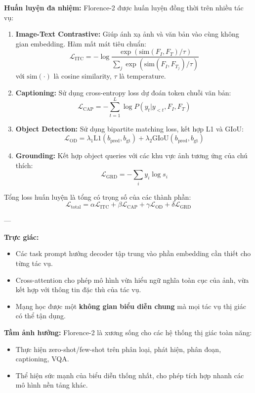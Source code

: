 \textbf{Huấn luyện đa nhiệm:}  
Florence-2 được huấn luyện đồng thời trên nhiều tác vụ:
\begin{enumerate}
	\item \textbf{Image-Text Contrastive:}  
	Giúp ánh xạ ảnh và văn bản vào cùng không gian embedding. Hàm mất mát tiêu chuẩn:
	\[
	\mathcal{L}_\text{ITC} = - \log \frac{\exp(\text{sim}(F_I, F_T)/\tau)}{\sum_j \exp(\text{sim}(F_I, F_{T_j})/\tau)}
	\]
	với $\text{sim}(\cdot)$ là cosine similarity, $\tau$ là temperature.
	
	\item \textbf{Captioning:}  
	Sử dụng cross-entropy loss dự đoán token chuỗi văn bản:
	\[
	\mathcal{L}_\text{CAP} = - \sum_{t=1}^{L} \log P(y_t | y_{<t}, F_I, F_T)
	\]
	
	\item \textbf{Object Detection:}  
	Sử dụng bipartite matching loss, kết hợp L1 và GIoU:
	\[
	\mathcal{L}_\text{OD} = \lambda_1 \text{L1}(b_\text{pred}, b_\text{gt}) + \lambda_2 \text{GIoU}(b_\text{pred}, b_\text{gt})
	\]
	
	\item \textbf{Grounding:}  
	Kết hợp object queries với các khu vực ảnh tương ứng của chú thích:
	\[
	\mathcal{L}_\text{GRD} = - \sum_i y_i \log s_i
	\]
\end{enumerate}

Tổng loss huấn luyện là tổng có trọng số của các thành phần:
\[
\mathcal{L}_\text{total} = \alpha \mathcal{L}_\text{ITC} + \beta \mathcal{L}_\text{CAP} + \gamma \mathcal{L}_\text{OD} + \delta \mathcal{L}_\text{GRD}
\]

---

\textbf{Trực giác:}  
\begin{itemize}
	\item Các task prompt hướng decoder tập trung vào phần embedding cần thiết cho từng tác vụ.
	\item Cross-attention cho phép mô hình vừa hiểu ngữ nghĩa toàn cục của ảnh, vừa kết hợp với thông tin đặc thù của tác vụ.
	\item Mạng học được một \textbf{không gian biểu diễn chung} mà mọi tác vụ thị giác có thể tận dụng.
\end{itemize}

\textbf{Tầm ảnh hưởng:}  
Florence-2 là xương sống cho các hệ thống thị giác toàn năng:
\begin{itemize}
	\item Thực hiện zero-shot/few-shot trên phân loại, phát hiện, phân đoạn, captioning, VQA.
	\item Thể hiện sức mạnh của biểu diễn thống nhất, cho phép tích hợp nhanh các mô hình nền tảng khác.
\end{itemize}

